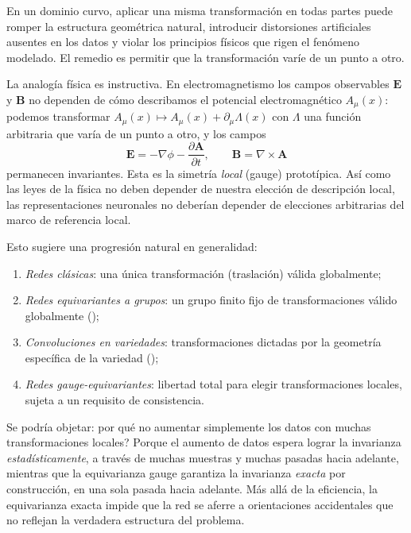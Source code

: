 En un dominio curvo, aplicar una misma transformaci\'on en todas partes puede
romper la estructura geom\'etrica natural, introducir distorsiones artificiales
ausentes en los datos y violar los principios f\'isicos que rigen el fen\'omeno
modelado. El remedio es permitir que la transformaci\'on var\'ie de un punto a
otro.

La analog\'ia f\'isica es instructiva. En electromagnetismo los campos
observables $\mathbf{E}$ y $\mathbf{B}$ no dependen de c\'omo describamos el
potencial electromagn\'etico $A_\mu(x)$: podemos transformar
$A_\mu(x) \mapsto A_\mu(x) + \partial_\mu \Lambda(x)$ con $\Lambda$ una funci\'on
arbitraria que var\'ia de un punto a otro, y los campos
\[
  \mathbf{E} = -\nabla \phi - \frac{\partial \mathbf{A}}{\partial t},
  \qquad
  \mathbf{B} = \nabla \times \mathbf{A}
\]
permanecen invariantes. Esta es la simetr\'ia \emph{local} (gauge) prototípica.
As\'i como las leyes de la f\'isica no deben depender de nuestra elecci\'on de
descripci\'on local, las representaciones neuronales no deber\'ian depender de
elecciones arbitrarias del marco de referencia local.

Esto sugiere una progresi\'on natural en generalidad:
\begin{enumerate}
  \item \emph{Redes cl\'asicas}: una \'unica transformaci\'on (traslaci\'on)
    v\'alida globalmente;
  \item \emph{Redes equivariantes a grupos}: un grupo finito fijo de
    transformaciones v\'alido globalmente ();
  \item \emph{Convoluciones en variedades}: transformaciones dictadas por la
    geometr\'ia espec\'ifica de la variedad ();
  \item \emph{Redes gauge-equivariantes}: libertad total para elegir
    transformaciones locales, sujeta a un requisito de consistencia.
\end{enumerate}

Se podr\'ia objetar: \textquestiondown por qu\'e no aumentar simplemente los datos con muchas
transformaciones locales? Porque el aumento de datos espera lograr la invarianza
\emph{estad\'isticamente}, a trav\'es de muchas muestras y muchas pasadas hacia
adelante, mientras que la equivarianza gauge garantiza la invarianza
\emph{exacta} por construcci\'on, en una sola pasada hacia adelante. M\'as
all\'a de la eficiencia, la equivarianza exacta impide que la red se aferre a
orientaciones accidentales que no reflejan la verdadera estructura del problema.

